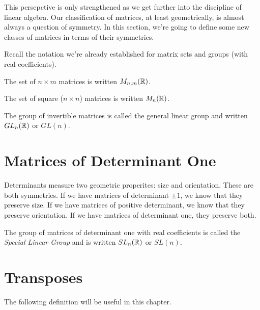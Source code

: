 \documentclass[fleqn]{report}
\begin{document}
This persepctive is only strengthened as we get further into
the discipline of linear algebra. Our classification of
matrices, at least geometrically, is almost always a question
of symmetry. In this section, we're going to define some new
classes of matrices in terms of their symmetries.

Recall the notation we're already established for matrix sets
and groups (with real coefficients).
\begin{smallitemize}
\item The set of $n \times m$ matrices is written
$M_{n,m}(\mathbb{R})$.
\item The set of square ($n \times n$) matrices is written
$M_n(\mathbb{R})$.
\item The group of invertible matrices is called the general
linear group and written $GL_n(\mathbb{R})$ or $GL(n)$.
\end{smallitemize}

\section{Matrices of Determinant One}

Determinants measure two geometric properites: size and
orientation. These are both symmetries. If we have matrices
of determinant $\pm 1$, we know that they preserve size. If we
have matrices of positive determinant, we know that they
preserve orientation. If we have matrices of determinant one,
they preserve both.

\begin{defn}
The group of matrices of determinant one with real
coefficients is called the \emph{Special Linear Group} and is
written $SL_n(\mathbb{R})$ or $SL(n)$.
\end{defn}

\section{Transposes}

The following definition will be useful in this chapter.
\end{document}
